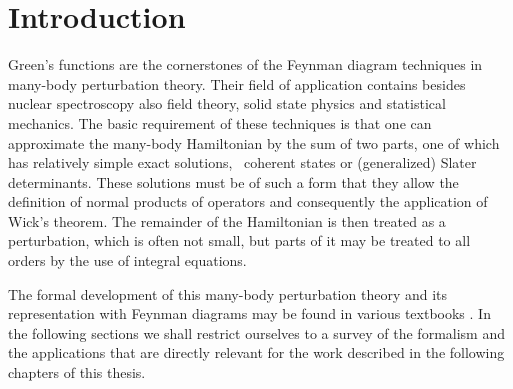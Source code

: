 \section{Introduction}
Green's functions are the cornerstones of the Feynman diagram techniques in 
many-body perturbation theory. Their field of application contains besides 
nuclear spectroscopy also field theory, solid state physics and statistical 
mechanics. The basic requirement of these techniques is that one can approximate the many-body Hamiltonian by the sum of two parts, one of which has 
relatively simple exact solutions, \eg\ coherent states or (generalized) Slater
determinants. These solutions must be of such a form that they allow the 
definition of normal products of operators and consequently the application of 
Wick's theorem\cite{AGD63,FW71}. The remainder of the Hamiltonian is then 
treated as a perturbation, which is often not small, but parts of it may be 
treated to all orders by the use of integral equations.

The formal development of this many-body perturbation theory and its 
representation with Feynman diagrams may be found in various textbooks
\cite{AGD63,FW71,KE88}. 
In the following sections we shall restrict ourselves to a 
survey of the formalism and the applications that are directly relevant for the 
work described in the following chapters of this thesis.
